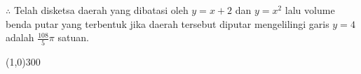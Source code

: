 \begin{enumerate}[leftmargin=*, label={\arabic*}.]


$\therefore$ Telah disketsa daerah yang dibatasi oleh $y=x+2$ dan $y=x^{2}$ lalu volume 
benda putar yang terbentuk jika daerah tersebut diputar mengelilingi garis $y=4$ adalah 
$\frac{108}{5}\pi$ satuan.

\end{enumerate}

\begin{center}\line(1,0){300}\end{center}
